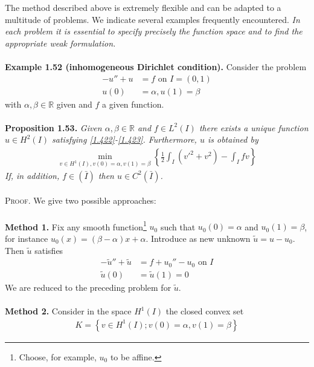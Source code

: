 \documentclass[a4paper,oneside]{book}
\numberwithin{equation}{chapter}
\begin{document}
The method described above is extremely flexible and can be adapted to a multitude of problems. We indicate several examples frequently encountered. \textit{In each problem it is essential to specify precisely the function space and to find the appropriate weak formulation.}\\
\\
\textbf{Example 1.52 (inhomogeneous Dirichlet condition).} Consider the problem
\begin{align}
\label{1.422}
 - u'' + u &= f\mbox{ on } I = \left( {0,1} \right)\\
u\left( 0 \right) &= \alpha ,u\left( 1 \right) = \beta \label{1.423}
\end{align}
with $\alpha,\beta\in \mathbb{R}$ given and $f$ a given function.\\
\\
\textbf{Proposition 1.53.} \textit{Given $\alpha,\beta \in \mathbb{R}$ and $f\in L^2\left(I\right)$ there exists a unique function $u\in H^2\left(I\right)$ satisfying \eqref{1.422}-\eqref{1.423}. Furthermore, $u$ is obtained by}
\begin{align}
\mathop {\min }\limits_{v \in {H^1}\left( I \right),v\left( 0 \right) = \alpha ,v\left( 1 \right) = \beta } \left\{ {\frac{1}{2}\int_I {\left( {v{'^2} + {v^2}} \right)}  - \int_I {fv} } \right\}
\end{align} 
\textit{If, in addition, $f\in \left(\bar I\right)$ then $u\in C^2\left(\bar I\right)$.}\\
\\
\textsc{Proof.} We give two possible approaches:\\
\\
\textbf{Method 1.} Fix any smooth function\footnote{Choose, for example, $u_0$ to be affine.} $u_0$ such that $u_0\left(0\right)=\alpha$ and $u_0\left(1\right)=\beta$, for instance ${u_0}\left( x \right) = \left( {\beta  - \alpha } \right)x + \alpha $. Introduce as new unknown $\tilde{u}=u-u_0$. Then $\tilde{u}$ satisfies
\begin{align}
 - \tilde u'' + \tilde u &= f + {u_0}'' - {u_0}\mbox{ on } I\\
\tilde u\left( 0 \right) &= \tilde u\left( 1 \right) = 0
\end{align}
We are reduced to the preceding problem for $\tilde{u}$.\\
\\
\textbf{Method 2.} Consider in the space $H^1\left(I\right)$ the closed convex set
\begin{align}
\label{1.427}
K = \left\{ {v \in {H^1}\left( I \right);v\left( 0 \right) = \alpha ,v\left( 1 \right) = \beta } \right\}
\end{align}
\end{document}
